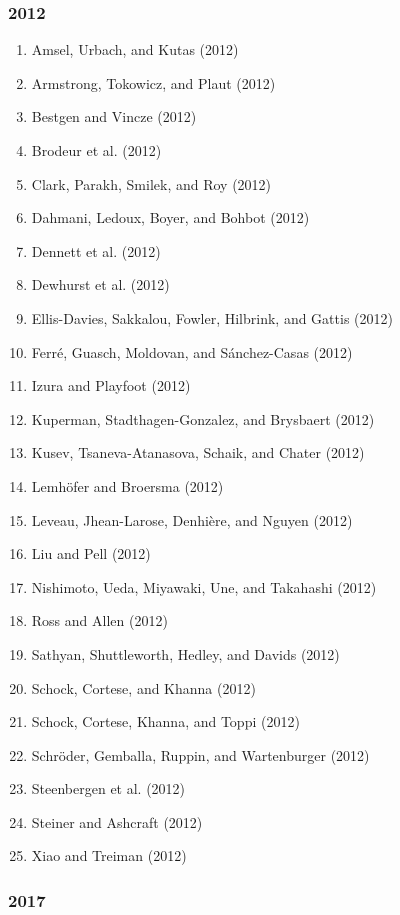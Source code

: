 \documentclass[english,man]{apa6}
\providecommand{\tightlist}{%
  \setlength{\itemsep}{0pt}\setlength{\parskip}{0pt}}
\theoremstyle{definition}
\theoremstyle{definition}
\theoremstyle{definition}
\theoremstyle{remark}
\begin{document}
\subsubsection{2012}\label{section-32}

\begin{enumerate}
\def\labelenumi{\arabic{enumi})}
\tightlist
\item
  Amsel, Urbach, and Kutas (2012)
\item
  Armstrong, Tokowicz, and Plaut (2012)
\item
  Bestgen and Vincze (2012)
\item
  Brodeur et al. (2012)
\item
  Clark, Parakh, Smilek, and Roy (2012)
\item
  Dahmani, Ledoux, Boyer, and Bohbot (2012)
\item
  Dennett et al. (2012)
\item
  Dewhurst et al. (2012)
\item
  Ellis-Davies, Sakkalou, Fowler, Hilbrink, and Gattis (2012)
\item
  Ferré, Guasch, Moldovan, and Sánchez-Casas (2012)
\item
  Izura and Playfoot (2012)
\item
  Kuperman, Stadthagen-Gonzalez, and Brysbaert (2012)
\item
  Kusev, Tsaneva-Atanasova, Schaik, and Chater (2012)
\item
  Lemhöfer and Broersma (2012)
\item
  Leveau, Jhean-Larose, Denhière, and Nguyen (2012)
\item
  Liu and Pell (2012)
\item
  Nishimoto, Ueda, Miyawaki, Une, and Takahashi (2012)
\item
  Ross and Allen (2012)
\item
  Sathyan, Shuttleworth, Hedley, and Davids (2012)
\item
  Schock, Cortese, and Khanna (2012)
\item
  Schock, Cortese, Khanna, and Toppi (2012)
\item
  Schröder, Gemballa, Ruppin, and Wartenburger (2012)
\item
  Steenbergen et al. (2012)
\item
  Steiner and Ashcraft (2012)
\item
  Xiao and Treiman (2012)
\end{enumerate}

\subsubsection{2017}\label{section-33}
\end{document}
